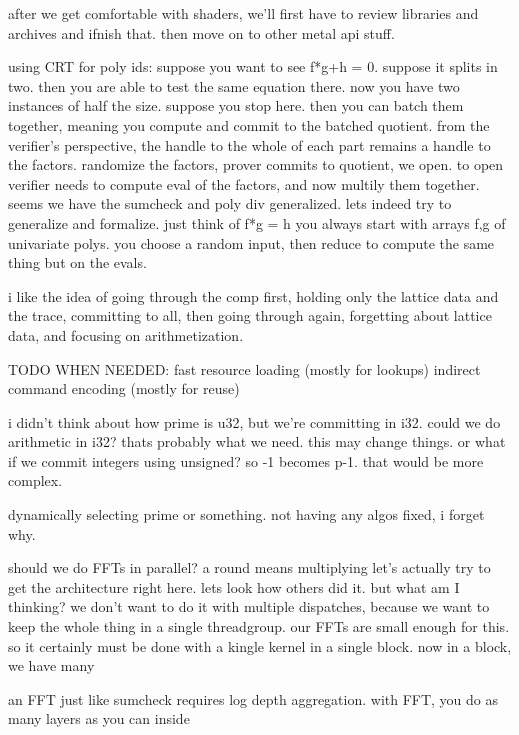 after we get comfortable with shaders, we'll first have to review libraries and archives and ifnish that. then move on to other metal api stuff. 


using CRT for poly ids:
suppose you want to see f*g+h = 0.
suppose it splits in two. then you are able to test the same equation there. 
now you have two instances of half the size. 
suppose you stop here. then you can batch them together, meaning you compute and commit to the batched quotient.
from the verifier's perspective, the handle to the whole of each part remains a handle to the factors.
randomize the factors, prover commits to quotient, we open.
to open verifier needs to compute eval of the factors, and now multily them together.
seems we have the sumcheck and poly div generalized.
lets indeed try to generalize and formalize.
just think of f*g = h
you always start with arrays f,g of univariate polys. you choose a random input, then reduce to compute the same thing but on the evals.




i like the idea of going through the comp first, holding only the lattice data and the trace, committing to all, then going through again, forgetting about lattice data, and focusing on arithmetization. 




TODO WHEN NEEDED:
fast resource loading (mostly for lookups)
indirect command encoding (mostly for reuse)



i didn't think about how prime is u32, but we're committing in i32.
could we do arithmetic in i32? thats probably what we need. this may change things.
or what if we commit integers using unsigned? so -1 becomes p-1. that would be more complex.

dynamically selecting prime or something. not having any algos fixed, i forget why.


should we do FFTs in parallel?
a round means multiplying
let's actually try to get the architecture right here. 
lets look how others did it. 
but what am I thinking?
we don't want to do it with multiple dispatches, because we want to keep the whole thing in a single threadgroup. our FFTs are small enough for this.
so it certainly must be done with a kingle kernel in a single block.
now in a block, we have many 

an FFT just like sumcheck requires log depth aggregation.
with FFT, you do as many layers as you can inside 



